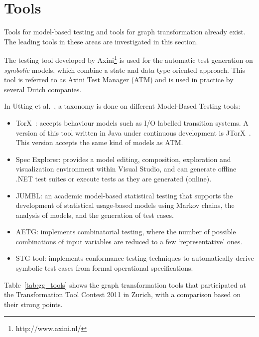 \section{Tools}
Tools for model-based testing and tools for graph transformation already exist. The leading tools in these areas are investigated in this section.

The testing tool developed by Axini\footnote{http://www.axini.nl/} is used for the automatic test generation on \textit{symbolic} models, which combine a state and data type oriented approach. This tool is referred to as Axini Test Manager (ATM) and is used in practice by several Dutch companies.

In Utting et al.~\cite{Utting:MBTTaxonomy}, a taxonomy is done on different Model-Based Testing tools:
\begin{itemize}
  \item TorX~\cite{Tretmans:TorX}: accepts behaviour models such as I/O labelled transition systems. A version of this tool written in Java under continuous development is JTorX~\cite{Belinfante:JTorX}. This version accepts the same kind of models as ATM.
  \item Spec Explorer\cite{Veanes:SpecExplorer}: provides a model editing, composition, exploration and visualization environment within Visual Studio, and can generate offline .NET test suites or execute tests as they are generated (online).
  \item JUMBL\cite{Prowell:JUMBL}: an academic model-based statistical testing that supports the development of statistical usage-based models using Markov chains, the analysis of models, and the generation of test cases.
  \item AETG\cite{Cohen:AETG}: implements combinatorial testing, where the number of possible combinations of input variables are reduced to a few `representative' ones.
  \item STG tool\cite{clarke:STG}: implements conformance testing techniques to automatically derive symbolic test cases from formal operational specifications.
\end{itemize}

Table~\ref{tab:gg_tools} shows the graph transformation tools that participated at the Transformation Tool Contest 2011 in Zurich\cite{DBLP:gg_tools}, with a comparison based on their strong points.

